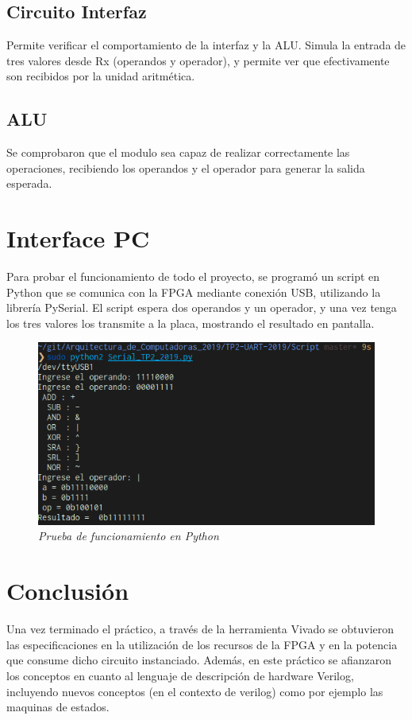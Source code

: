 \documentclass[12pt,A4paper,titlepage]{article}
\begin{document}
\subsection{Circuito Interfaz}
Permite verificar el comportamiento de la interfaz y la ALU. Simula la entrada de tres valores desde Rx (operandos y operador), y permite ver que efectivamente son recibidos por la unidad aritmética.

\subsection{ALU}
Se comprobaron que el modulo sea capaz de realizar correctamente las operaciones, recibiendo los operandos y el operador para generar la salida esperada.

\section{Interface PC}
Para probar el funcionamiento de todo el proyecto, se programó un script en Python que se comunica con la FPGA mediante conexión USB, utilizando la librería PySerial. El script espera dos operandos y un operador, y una vez tenga los tres valores los transmite a la placa, mostrando el resultado en pantalla.

\begin{figure}[H]
    \centering
    \includegraphics[width=\textwidth]{figure/scriptPython.png}
    \caption{\textit{Prueba de funcionamiento en Python}}
    \label{fig:scriptPython}
\end{figure}

\newpage
\section{Conclusión}
Una vez terminado el práctico, a través de la herramienta Vivado se
obtuvieron las especificaciones en la utilización de los recursos de la FPGA y en la potencia que consume dicho circuito instanciado. Además, en este práctico se afianzaron los conceptos en cuanto al lenguaje de descripción de hardware Verilog, incluyendo nuevos conceptos (en el contexto de verilog) como por ejemplo las maquinas de estados.
\end{document}
